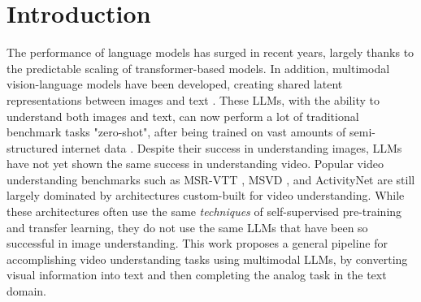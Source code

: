 \section{Introduction}

The performance of language models has surged in recent years, largely thanks to the predictable scaling of transformer-based models.
In addition, multimodal vision-language models have been developed,  creating shared latent representations between images and text \cite{clip} \cite{coca} \cite{mmbt}.
These LLMs, with the ability to understand both images and text, can now perform a lot of traditional benchmark tasks "zero-shot", after being trained on vast amounts of semi-structured internet data \cite{gpt4vision} \cite{clip} \cite{gemini} \cite{flamingo}.
Despite their success in understanding images, LLMs have not yet shown the same success in understanding video.
Popular video understanding benchmarks such as MSR-VTT \cite{msr-vtt}, MSVD \cite{msvd}, and ActivityNet \cite{activitynet} are still largely dominated by architectures custom-built for video understanding.
While these architectures often use the same \textit{techniques} of self-supervised pre-training and transfer learning, they do not use the same LLMs that have been so successful in image understanding.
This work proposes a general pipeline for accomplishing video understanding tasks using multimodal LLMs, by converting visual information into text and then completing the analog task in the text domain.

